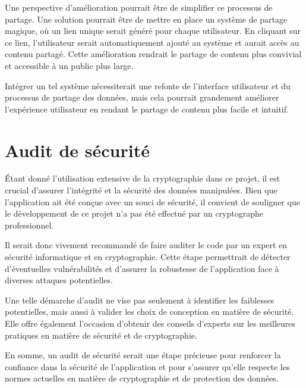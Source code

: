 Une perspective d'amélioration pourrait être de simplifier ce processus de partage. Une solution pourrait être de mettre en place un système de \guillemotleft partage magique\guillemotright, où un lien unique serait généré pour chaque utilisateur. En cliquant sur ce lien, l'utilisateur serait automatiquement ajouté au système et aurait accès au contenu partagé. Cette amélioration rendrait le partage de contenu plus convivial et accessible à un public plus large.

Intégrer un tel système nécessiterait une refonte de l'interface utilisateur et du processus de partage des données, mais cela pourrait grandement améliorer l'expérience utilisateur en rendant le partage de contenu plus facile et intuitif.

\section{Audit de sécurité}

Étant donné l'utilisation extensive de la cryptographie dans ce projet, il est crucial d'assurer l'intégrité et la sécurité des données manipulées. Bien que l'application ait été conçue avec un souci de sécurité, il convient de souligner que le développement de ce projet n'a pas été effectué par un cryptographe professionnel.

Il serait donc vivement recommandé de faire auditer le code par un expert en sécurité informatique et en cryptographie. Cette étape permettrait de détecter d'éventuelles vulnérabilités et d'assurer la robustesse de l'application face à diverses attaques potentielles.

Une telle démarche d'audit ne vise pas seulement à identifier les faiblesses potentielles, mais aussi à valider les choix de conception en matière de sécurité. Elle offre également l'occasion d'obtenir des conseils d'experts sur les meilleures pratiques en matière de sécurité et de cryptographie.

En somme, un audit de sécurité serait une étape précieuse pour renforcer la confiance dans la sécurité de l'application et pour s'assurer qu'elle respecte les normes actuelles en matière de cryptographie et de protection des données.